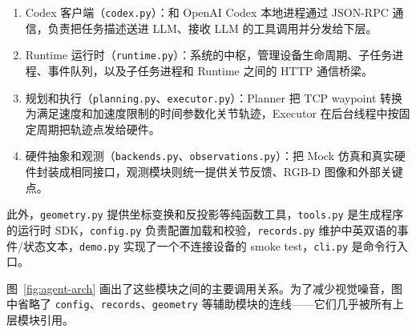 \begin{enumerate}
  \item Codex 客户端（\texttt{codex.py}）：和 OpenAI Codex 本地进程通过 JSON-RPC 通信，负责把任务描述送进 LLM、接收 LLM 的工具调用并分发给下层。
  \item Runtime 运行时（\texttt{runtime.py}）：系统的中枢，管理设备生命周期、子任务进程、事件队列，以及子任务进程和 Runtime 之间的 HTTP 通信桥梁。
  \item 规划和执行（\texttt{planning.py}、\texttt{executor.py}）：Planner 把 TCP waypoint 转换为满足速度和加速度限制的时间参数化关节轨迹，Executor 在后台线程中按固定周期把轨迹点发给硬件。
  \item 硬件抽象和观测（\texttt{backends.py}、\texttt{observations.py}）：把 Mock 仿真和真实硬件封装成相同接口，观测模块则统一提供关节反馈、RGB-D 图像和外部关键点。
\end{enumerate}

此外，\texttt{geometry.py} 提供坐标变换和反投影等纯函数工具，\texttt{tools.py} 是生成程序的运行时 SDK，\texttt{config.py} 负责配置加载和校验，\texttt{records.py} 维护中英双语的事件/状态文本，\texttt{demo.py} 实现了一个不连接设备的 smoke test，\texttt{cli.py} 是命令行入口。

图~\ref{fig:agent-arch} 画出了这些模块之间的主要调用关系。为了减少视觉噪音，图中省略了 \texttt{config}、\texttt{records}、\texttt{geometry} 等辅助模块的连线——它们几乎被所有上层模块引用。

